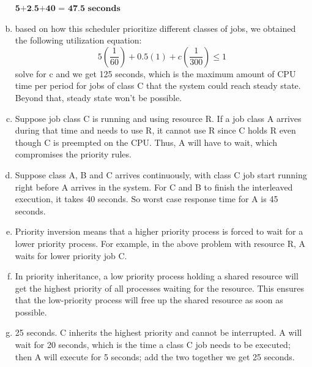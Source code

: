 \documentclass{article}   	                         %
\begin{document}
\begin{enumerate}[(a)]
$\textbf {5+2.5+40 = 47.5 seconds}$\\
\item
based on how this scheduler prioritize different classes of jobs, we obtained the following utilization equation:\\
\begin{equation}5\left(\frac{1}{60}\right) + 0.5(1) +c\left(\frac{1}{300}\right) \leq 1 \end{equation}
solve for c and we get 125 seconds, which is the maximum amount of CPU time per period for jobs of class C that the system could reach steady state. Beyond that, steady state won't be possible.\\
\item
Suppose job class C is running and using resource R. If a job class A arrives during that time and needs to use R, it cannot use R since C holds R even though C is preempted on the CPU. Thus, A will have to wait, which compromises the priority rules.
\item
Suppose class A, B and C arrives continuously, with class C job start running right before A arrives in the system. For C and B to finish the interleaved execution, it takes 40 seconds. So worst case response time for A is 45 seconds.\\
\item
Priority inversion means that a higher priority process is forced to wait for a lower priority process. For example, in the above problem with resource R, A waits for lower priority job C.\\
\item
In priority inheritance, a low priority process holding a shared resource will get the highest priority of all processes waiting for the resource. This ensures that the low-priority process will free up the shared resource as soon as possible.\\
\item
25 seconds. C inherits the highest priority and cannot be interrupted. A will wait for 20 seconds, which is the time a class C job needs to be executed; then A will execute for 5 seconds; add the two together we get 25 seconds.
\end{enumerate}
\end{document}
